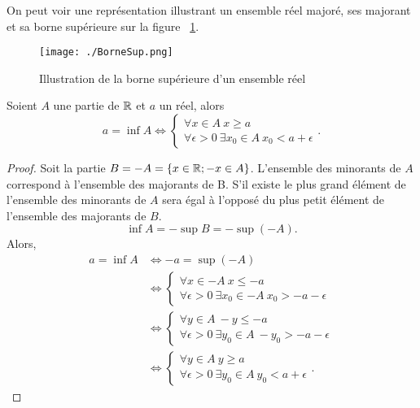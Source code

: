 On peut voir une représentation illustrant un ensemble réel majoré, ses majorant 
et sa borne supérieure sur la figure~
\ref{fig:BorneSup}.
\begin{figure}[h]
  \centering
  \texttt{[image: ./BorneSup.png]}
  \caption{Illustration de la borne supérieure d'un ensemble réel}
  \label{fig:BorneSup}
\end{figure}
\begin{theo}
  Soient \(A\) une partie de \(\mathbb{R}\) et \(a\) un réel, alors
  \begin{equation}
    a=\inf A \iff \begin{cases} \forall x \in A \ x\geqslant a \\  \forall 
    \epsilon >0 \ \exists x_0\in A \ x_0<a+\epsilon\end{cases}.
  \end{equation}
\end{theo}
\begin{proof}
  Soit la partie \(B=-A=\{x\in\mathbb{R}; -x\in A\}\). L'ensemble des minorants de \(A\) 
  correspond à l'ensemble des majorants de B. S'il existe le plus grand élément 
  de l'ensemble des minorants de \(A\) sera égal à l'opposé du plus petit 
  élément de l'ensemble des majorants de \(B\).
  \begin{equation}
    \inf A=-\sup B=-\sup(-A).
  \end{equation}
  Alors,
  \begin{align}
    a=\inf A &\iff -a=\sup(-A)\\
             &\iff \begin{cases} \forall x \in -A \ x\leqslant -a \\ \forall 
             \epsilon>0 \ \exists x_0 \in -A \ x_0>-a-\epsilon \end{cases}\\
             &\iff \begin{cases} \forall y \in A \ -y\leqslant -a \\ \forall 
             \epsilon>0 \ \exists y_0 \in A \ -y_0>-a-\epsilon \end{cases}\\
             &\iff \begin{cases} \forall y \in A \ y\geqslant a \\ \forall 
             \epsilon>0 \ \exists y_0 \in A \ y_0<a+\epsilon \end{cases}.
  \end{align}
\end{proof}

